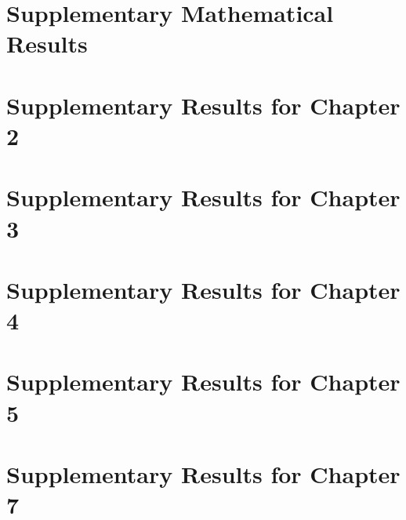 \documentclass[a4paper]{ustthesis}
\begin{document}
\appendix

\chapter{Supplementary Mathematical Results}
\label{chp_math}


\chapter{Supplementary Results for Chapter 2}
\label{chp_appendix_preliminaries}


\chapter{Supplementary Results for Chapter 3}
\label{chp_appendix_icm}


\chapter{Supplementary Results for Chapter 4}
\label{chp_appendix_soe}


\chapter{Supplementary Results for Chapter 5}
\label{chp_appendix_rbe}


\chapter{Supplementary Results for Chapter 7}
\label{chp_appendix_quasiewald}


\end{document}
